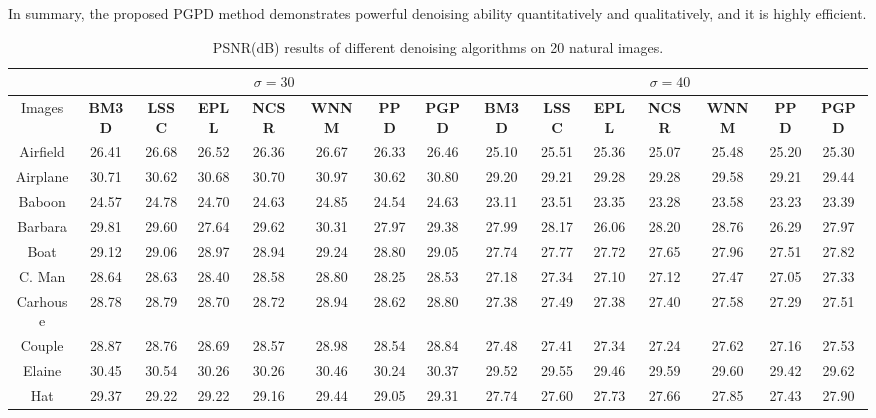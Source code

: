 In summary, the proposed PGPD method demonstrates powerful denoising ability quantitatively and qualitatively, and it is highly efficient.
\begin{table}[t]
\caption{PSNR(dB) results of different denoising algorithms on 20 natural images.}
\label{tab1}
\begin{center}
\renewcommand\arraystretch{1.0}
\scriptsize
\begin{tabular}{|c||c|c|c|c|c|c|c||c|c|c|c|c|c|c|}
\hline
&\multicolumn{7}{c||}{ $\sigma = 30$}&\multicolumn{7}{c|}{ $\sigma = 40$}
\\
\hline
\hline
Images&\textbf{BM3D}&\textbf{LSSC}&\textbf{EPLL}&\textbf{NCSR}&\textbf{WNNM}&\textbf{PPD}&\textbf{PGPD}
&\textbf{BM3D}&\textbf{LSSC}&\textbf{EPLL}&\textbf{NCSR}&\textbf{WNNM}&\textbf{PPD}&\textbf{PGPD} 
\\
\hline
Airfield& 26.41 & 26.68 & 26.52  &  26.36  & 26.67 &26.33  & 26.46     & 25.10 &  25.51  & 25.36 & 25.07 & 25.48&25.20 & 25.30 
\\
\hline
Airplane&  30.71  & 30.62  &  30.68  &  30.70 & 30.97 &30.62 &  30.80    & 29.20 & 29.21  & 29.28 & 29.28 & 29.58&29.21&29.44
\\
\hline
 Baboon & 24.57   & 24.78  & 24.70   & 24.63  & 24.85&24.54 & 24.63   &  23.11 &  23.51  & 23.35 & 23.28 & 23.58 & 23.23&23.39   
\\
\hline 
 Barbara & 29.81  & 29.60 & 27.64 & 29.62 & 30.31& 27.97 & 29.38   &  27.99 & 28.17 & 26.06 & 28.20 &28.76 & 26.29 & 27.97
\\
\hline
 Boat & 29.12  & 29.06  & 28.97 & 28.94 & 29.24& 28.80 &  29.05   &  27.74& 27.77  &  27.72 & 27.65 &27.96  &27.51 & 27.82    
\\
\hline
 C. Man& 28.64 & 28.63 & 28.40  & 28.58 & 28.80& 28.25& 28.53     & 27.18& 27.34  & 27.10 &27.12  &27.47 & 27.05& 27.33
\\
\hline
 Carhouse& 28.78 & 28.79   & 28.70    & 28.72 & 28.94 &28.62 & 28.80   & 27.38 &  27.49 & 27.38 & 27.40 & 27.58 & 27.29&27.51
\\
\hline
 Couple & 28.87  & 28.76  & 28.69 & 28.57 & 28.98& 28.54 & 28.84    & 27.48 & 27.41 &  27.34  & 27.24 & 27.62 & 27.16 & 27.53   
\\
\hline
 Elaine& 30.45 & 30.54 & 30.26   &  30.26  & 30.46&30.24& 30.37    &29.52 & 29.55 & 29.46 & 29.59 & 29.60&29.42&29.62   
\\
\hline
 Hat& 29.37 & 29.22  & 29.22   &  29.16  & 29.44  & 29.05  &29.31    & 27.74 & 27.60 &  27.73  &  27.66 & 27.85 &27.43&27.90   
\\

\end{tabular}
\end{center}
\end{table}
